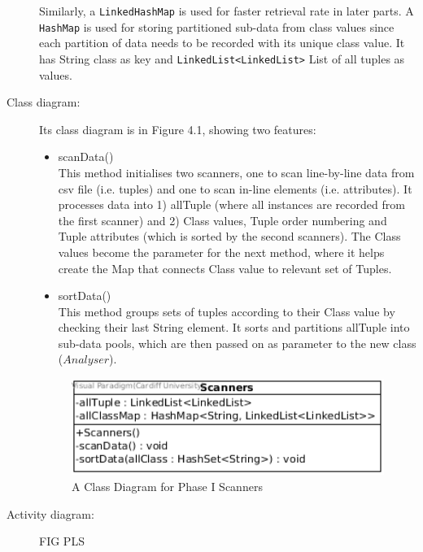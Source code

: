 \begin{description}
Similarly, a \texttt{LinkedHashMap} is used for faster retrieval rate in later parts. A \texttt{HashMap} is used for storing partitioned sub-data from class values since each partition of data needs to be recorded with its unique class value. It has String class as key and \texttt{LinkedList<LinkedList>} List of all tuples as values. 

\item[Class diagram: ] 

Its class diagram is in Figure 4.1, showing two features:
\begin{itemize}
	\item{scanData()} \\
	This method initialises two scanners, one to scan line-by-line data from csv file (i.e. tuples) and one to scan in-line elements (i.e. attributes).
	It processes data into 1) allTuple (where all instances are recorded from the first scanner) and 2) Class values, Tuple order numbering and Tuple attributes (which is sorted by the second scanners).
	The Class values become the parameter for the next method, where it helps create the Map that connects Class value to relevant set of Tuples.
	\item{sortData()} \\
	This method groups sets of tuples according to their Class value by checking their last String element. It sorts and partitions allTuple into sub-data pools, which are then passed on as parameter to the new class ($Analyser$).
	
\end{itemize}

\begin{figure}[!htbp]
    \centering
    \includegraphics[width=4in]{figures/class_scanners}
    \caption[A Class Diagram for Phase I Scanners]{A Class Diagram for Phase I Scanners}
    \label{fig:figure4_1}
\end{figure}

\item[Activity diagram: ] 

FIG PLS

\end{description}


